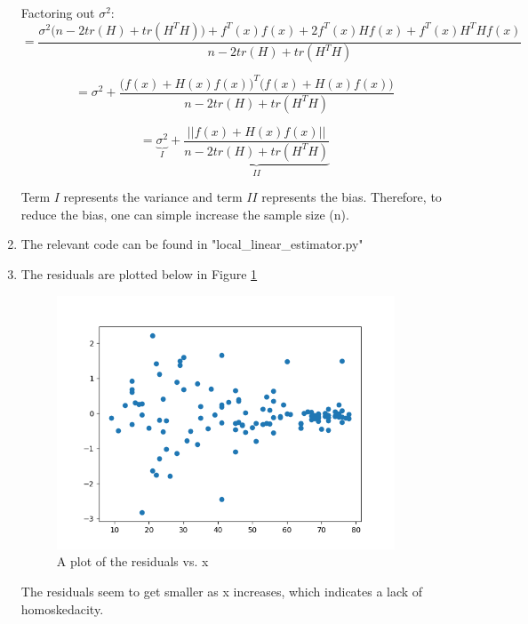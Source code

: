\documentclass[10pt]{article}
\begin{document}
\begin{enumerate}[label=(\Alph*)]
        Factoring out $\sigma^2$:
        $$=\frac{\sigma^2\bigg(n-2tr(H) + tr(H^TH)\bigg) + f^T(x)f(x) +2f^T(x)Hf(x)+f^T(x)H^THf(x)}{n-2tr(H)+tr(H^TH)}$$

        $$=\sigma^2 + \frac{\bigg(f(x)+H(x)f(x)\bigg)^T\bigg(f(x)+H(x)f(x)\bigg)}{n-2tr(H)+tr(H^TH)}$$

        $$=\underbrace{\sigma^2}_{I} + \underbrace{\frac{||f(x)+H(x)f(x)||}{n-2tr(H)+tr(H^TH)}}_{II}$$


        Term $I$ represents the variance and term $II$ represents the bias. Therefore, to reduce the bias, one can simple increase the sample size (n).

        \item
        The relevant code can be found in "local\_linear\_estimator.py"

        \item
     	The residuals are plotted below in Figure \ref{fig:residual_plot}
		\begin{figure}[htb] \centering
		\includegraphics[width=0.95\textwidth]{./residual_plot.png}
		\caption{A plot of the residuals vs. x}
		\label{fig:residual_plot}
		\end{figure}

		The residuals seem to get smaller as x increases, which indicates a lack of homoskedacity.


\end{enumerate}
\end{document}
